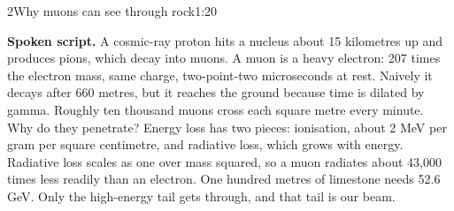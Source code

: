 \documentclass[11pt,a4paper]{article}
\newcommand{\spoken}{\par\smallskip\noindent\textbf{Spoken script.}\;}
\begin{document}
\begin{slidebox}{2}{Why muons can see through rock}{1:20}
\begin{center}
\end{center}
\spoken
A cosmic-ray proton hits a nucleus about 15 kilometres up and produces pions,
which decay into muons. A muon is a heavy electron: 207 times the electron
mass, same charge, two-point-two microseconds at rest. Naively it decays after
660 metres, but it reaches the ground because time is dilated by gamma.
Roughly ten thousand muons cross each square metre every minute. Why do they
penetrate? Energy loss has two pieces: ionisation, about 2 MeV per gram per
square centimetre, and radiative loss, which grows with energy. Radiative loss
scales as one over mass squared, so a muon radiates about 43,000 times less
readily than an electron. One hundred metres of limestone needs 52.6 GeV. Only
the high-energy tail gets through, and that tail is our beam.
\end{slidebox}
\end{document}
